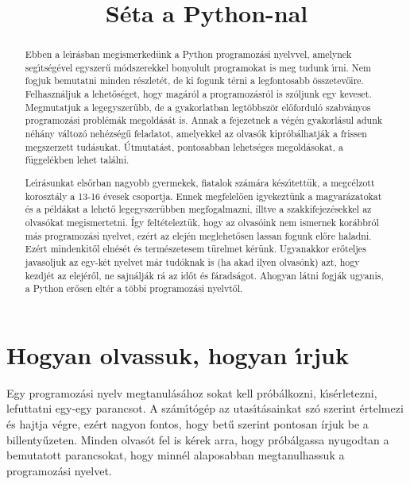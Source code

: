 \documentclass[12pt]{article}
\title{S\'eta a Python-nal}
\newcounter{feladat}
\newcounter{megold}
\begin{document}
\maketitle
\thispagestyle{fancy}


\begin{abstract}
Ebben a le\'{\i}r\'asban megismerked\"unk a Python programoz\'asi nyelvvel, a\-mely\-nek seg\'{\i}ts\'eg\'evel 
egyszer\H{u} m\'odszerekkel bonyolult programokat is meg tud\-unk \'{\i}r\-ni. Nem fogjuk bemutatni minden 
r\'eszlet\'et, de ki fogunk t\'erni a legfontosabb \"osszetev\H{o}ire. Felhaszn\'aljuk a lehet\H{o}s\'eget, 
hogy mag\'ar\'ol a programoz\'asr\'ol is sz\'oljunk egy keveset. Megmutatjuk a legegyszer\H{u}bb, de a 
gyakorlatban legt\"obbsz\"or el\H{o}fordul\'o szabv\'anyos programoz\'asi probl\'em\'ak megold\'as\'at is. 
Annak a fejezetnek a v\'eg\'en gyakorl\'asul adunk n\'eh\'any v\'altoz\'o neh\'ezs\'eg\H{u} feladatot, amelyekkel 
az olvas\'ok kipr\'ob\'alhatj\'ak a frissen megszerzett tud\'asukat. \'Utmutat\'ast, pontosabban lehets\'eges 
megold\'asokat, a f\"ugge\-l\'ek\-ben lehet tal\'alni. 

Le\'{\i}r\'asunkat els\H{o}rban nagyobb gyermekek, fiatalok sz\'am\'ara k\'esz\'{\i}\-tet\-t\"uk, a megc\'elzott 
koroszt\'aly a 13-16 \'evesek csoportja. Ennek megfelel\H{o}en igyekezt\"unk a magyar\'azatokat \'es a 
p\'eld\'akat a lehet\H{o} legegyszer\H{u}bben megfogalmazni, \'illtve a szakkifejez\'esekkel az olvas\'okat 
megismertetni. \'Igy felt\'etelezt\"uk, hogy az olvas\'oink nem ismernek kor\'abbr\'ol m\'as programoz\'asi 
nyelvet, ez\'ert az elej\'en meglehet\H{o}sen lassan fogunk el\H{o}re haladni. Ez\'ert mindenkit\H{o}l 
eln\'es\'et \'es term\'eszetesem t\"urelmet k\'er\"unk. Ugyanakkor er\H{o}teljes javasoljuk az egy-k\'et 
nyelvet m\'ar tud\'oknak is (ha akad ilyen olvas\'onk) azt, hogy kezdj\'et az elej\'er\H{o}l, ne sajn\'alj\'ak 
r\'a az id\H{o}t \'es f\'arads\'agot. Ahogyan l\'atni fogj\'ak ugyanis, a Python er\H{o}sen elt\'er a t\"obbi 
programoz\'asi nyelvt\H{o}l.
\end{abstract}

\tableofcontents

\section{Hogyan olvassuk, hogyan \'{\i}rjuk}

Egy programoz\'asi nyelv megtanul\'as\'ahoz sokat kell pr\'ob\'alkozni, k\'{\i}s\'erletezni, 
lefuttatni egy-egy parancsot. A sz\'am\'{\i}t\'og\'ep az utas\'{\i}t\'asainkat sz\'o 
szerint \'ertelmezi \'es hajtja v\'egre, ez\'ert nagyon fontos, hogy bet\H{u} szerint 
pontosan \'{i}rjuk be a billenty\H{u}zeten. Minden olvas\'ot fel is k\'erek arra, hogy 
pr\'ob\'algassa nyugodtan a bemutatott parancsokat, hogy minn\'el alaposabban megtanulhassuk 
a programoz\'asi nyelvet.
\end{document}
